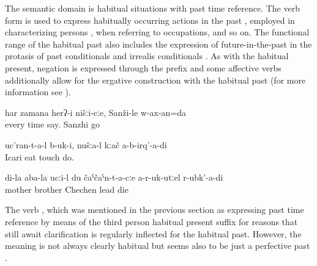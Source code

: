 The semantic domain is habitual situations with past time reference. The verb form is used to express habitually occurring actions in the past , employed in characterizing persons , when referring to occupations, and so on. The functional range of the habitual past also includes the expression of future-in-the-past in the protasis of past conditionals and irrealis conditionals . As with the habitual present, negation is expressed through the prefix   and some affective verbs additionally allow for the ergative construction with the habitual past (for more information see ).
%
\begin{exe}
	\ex	\label{ex:He always told us}
	\gll	har	zamana	herʔ-i	nišːi-cːe,	Sanži-le	w-ax-an=da\\
		every	time	say.		Sanzhi	go\\
	\glt	{}

	\ex	\label{ex:Icari people ate it}
	\gll	uc'ran-t-a-l	b-uk-i,	nušːa-l	kːač	a-b-irq'-a-di\\
		Icari	eat		touch	do.\\
	\glt	{}

	\ex	\label{ex:If my mother's brother would not have brought me to Chechnya}
	\gll	di-la	aba-la	ucːi-l	du	čaˁčaˁn-t-a-cːe	a-r-uk-utːel		r-ubk'-a-di\\
			mother	brother		Chechen	lead	die\\
	\glt	{}

\end{exe}


The verb  , which was mentioned in the previous section as expressing past time reference by means of the third person habitual present suffix for reasons that still await clarification is regularly inflected for the habitual past. However, the meaning is not always clearly habitual but seems also to be just a perfective past .

